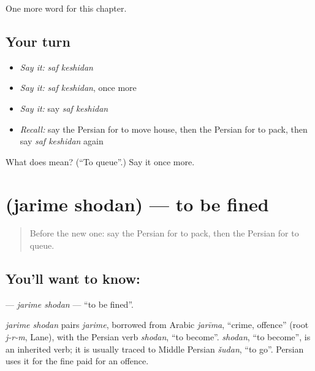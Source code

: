 \begin{grammarlens}[title={What you've built}]
One more word for this chapter.
\end{grammarlens}

\subsection*{Your turn}
\begin{itemize}
\raggedright
  \item \emph{Say it:} \emph{saf keshidan}
  \item \emph{Say it:} \emph{saf keshidan}, once more
  \item \emph{Say it:} say \emph{saf keshidan}
  \item \emph{Recall:} say the Persian for to move house, then the Persian for to pack, then say \emph{saf keshidan} again
\end{itemize}

\begin{tcolorbox}[breakable,colback=teal!4,colframe=teal!35!black,title={Before you move on}]
What does   mean? (\textquotedblleft{}To queue\textquotedblright{}.) Say it once more.
\end{tcolorbox}
\section[\texorpdfstring{\fa{جریمه} \fa{شدن} (jarime shodan)}{جریمه شدن (jarime shodan)}]{  (jarime shodan) — to be fined}

\label{lesson:FA-C262-jarime-shodan}



\begin{quote}
Before the new one: say the Persian for to pack, then the Persian for to queue.
\end{quote}

\subsection*{You'll want to know:  }
\textbf{ } — \emph{jarime shodan} — \textquotedblleft{}to be fined\textquotedblright{}.

\begin{cousinweb}
\emph{jarime shodan} pairs \emph{jarime}, borrowed from Arabic \emph{jarīma}, \textquotedblleft{}crime, offence\textquotedblright{} (root \emph{j-r-m}, Lane), with the Persian verb \emph{shodan}, \textquotedblleft{}to become\textquotedblright{}. \emph{shodan}, \textquotedblleft{}to become\textquotedblright{}, is an inherited verb; it is usually traced to Middle Persian \emph{šudan}, \textquotedblleft{}to go\textquotedblright{}. Persian uses it for the fine paid for an offence.
\end{cousinweb}

